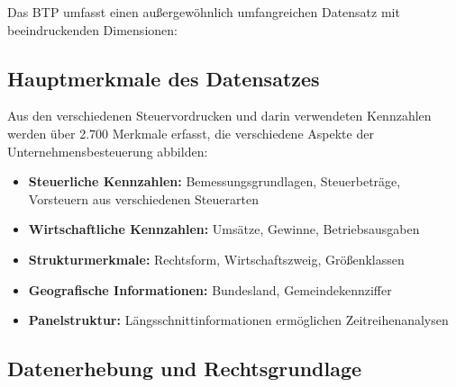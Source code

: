 \documentclass[
  ngerman,
  10pt,
  letterpaper,
  twocolumn]{book}
\providecommand{\tightlist}{%
  \setlength{\itemsep}{0pt}\setlength{\parskip}{0pt}}
\let\origtable\table
\let\endorigtable\endtable
\renewenvironment{table}[1][htbp]{%
  \origtable*[#1]%
}{%
  \endorigtable*%
}
\begin{document}
Das BTP umfasst einen außergewöhnlich umfangreichen Datensatz mit
beeindruckenden Dimensionen:

\begin{table}

\caption{\label{tbl-btp-overview}Übersicht über die Dimensionen des
Business-Tax-Panel}


\end{table}%

\subsection{Hauptmerkmale des
Datensatzes}\label{hauptmerkmale-des-datensatzes}

Aus den verschiedenen Steuervordrucken und darin verwendeten Kennzahlen
werden über 2.700 Merkmale erfasst, die verschiedene Aspekte der
Unternehmensbesteuerung abbilden:

\begin{itemize}
\tightlist
\item
  \textbf{Steuerliche Kennzahlen:} Bemessungsgrundlagen, Steuerbeträge,
  Vorsteuern aus verschiedenen Steuerarten
\item
  \textbf{Wirtschaftliche Kennzahlen:} Umsätze, Gewinne,
  Betriebsausgaben
\item
  \textbf{Strukturmerkmale:} Rechtsform, Wirtschaftszweig, Größenklassen
\item
  \textbf{Geografische Informationen:} Bundesland, Gemeindekennziffer
\item
  \textbf{Panelstruktur:} Längsschnittinformationen ermöglichen
  Zeitreihenanalysen
\end{itemize}

\subsection{Datenerhebung und
Rechtsgrundlage}\label{datenerhebung-und-rechtsgrundlage}
\end{document}
